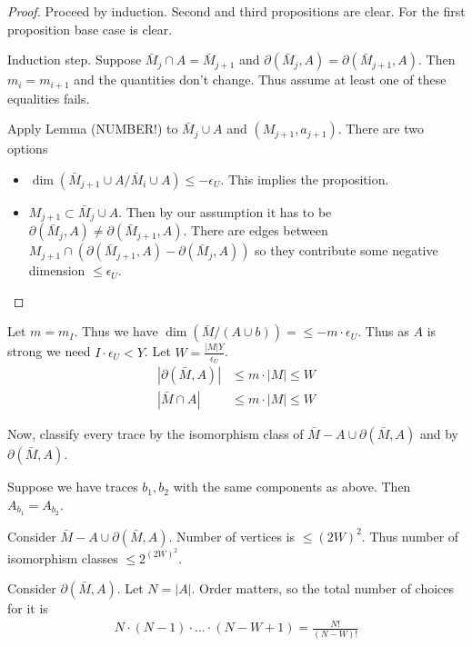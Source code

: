 \documentclass{amsart}
\begin{document}
\begin{proof}
	Proceed by induction.
	Second and third propositions are clear.
	For the first proposition base case is clear.
	
	Induction step.
	Suppose $\bar M_j \cap A = \bar M_{j+1}$ and $\partial(\bar M_j, A) = \partial(\bar M_{j+1}, A)$.
	Then $m_i = m_{i+1}$ and the quantities don't change.
	Thus assume at least one of these equalities fails.
	
	Apply Lemma (NUMBER!) to $\bar M_j \cup A$ and $(M_{j+1}, a_{j+1})$.
	There are two options
	
	\begin{itemize}
		\item $\dim(\bar M_{j+1} \cup A / \bar M_i \cup A) \leq -\epsilon_U$.
		This implies the proposition.
		\item $M_{j+1} \subset \bar M_j \cup A$.
		Then by our assumption it has to be $\partial(\bar M_j, A) \neq \partial(\bar M_{j+1}, A)$.
		There are edges between $M_{j+1} \cap (\partial(\bar M_{j+1}, A) - \partial(\bar M_j, A))$ so they contribute some negative dimension $\leq \epsilon_U$.
	\end{itemize}
\end{proof}

Let $m = m_I$.
Thus we have $\dim(\bar M / (A \cup b)) = \leq -m \cdot \epsilon_U $.
Thus as $A$ is strong we need $I \cdot \epsilon_U < Y$.
Let $W = \frac{|M|Y}{\epsilon_U}$.
\begin{align*}
	|\partial(\bar M, A)| &\leq m \cdot |M| \leq W \\
	|\bar M \cap A| &\leq m \cdot |M| \leq W
\end{align*}

Now, classify every trace by the isomorphism class of $\bar M - A \cup \partial(\bar M, A)$ and by $\partial(\bar M, A)$.
\begin{Lemma}
	Suppose we have traces $b_1, b_2$ with the same components as above.
	Then $A_{b_1} = A_{b_2}$.
\end{Lemma}

Consider $\bar M - A \cup \partial(\bar M, A)$.
Number of vertices is $\leq (2W)^2$.
Thus number of isomorphism classes $\leq 2^{(2W)^2}$.

Consider $\partial(\bar M, A)$.
Let $N = |A|$.
Order matters, so the total number of choices for it is
\begin{align*}
	N \cdot (N-1) \cdot \ldots \cdot (N - W + 1) = \frac{N!}{(N-W)!}
\end{align*}
\end{document}
